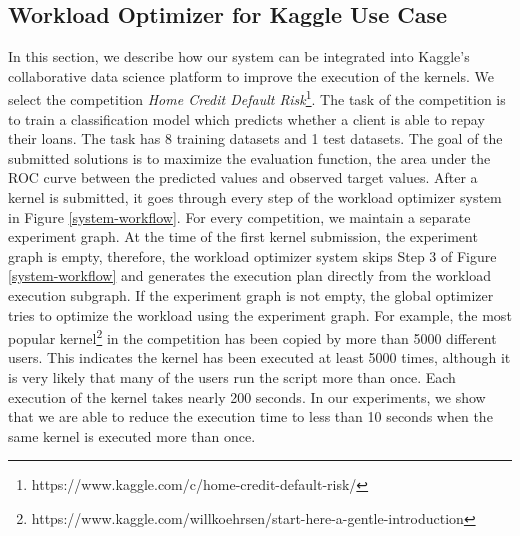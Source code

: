 \subsection{Workload Optimizer for Kaggle Use Case}
In this section, we describe how our system can be integrated into Kaggle's collaborative data science platform to improve the execution of the kernels.
We select the competition \textit{Home Credit Default Risk}\footnote{https://www.kaggle.com/c/home-credit-default-risk/}.
The task of the competition is to train a classification model which predicts whether a client is able to repay their loans.
The task has 8 training datasets and 1 test datasets.
The goal of the submitted solutions is to maximize the evaluation function, the area under the ROC curve between the predicted values and observed target values.
After a kernel is submitted, it goes through every step of the workload optimizer system in Figure \ref{system-workflow}.
For every competition, we maintain a separate experiment graph.
At the time of the first kernel submission, the experiment graph is empty, therefore, the workload optimizer system skips Step 3 of Figure \ref{system-workflow} and generates the execution plan directly from the workload execution subgraph.
If the experiment graph is not empty, the global optimizer tries to optimize the workload using the experiment graph.
For example, the most popular kernel\footnote{https://www.kaggle.com/willkoehrsen/start-here-a-gentle-introduction} in the competition has been copied by more than 5000 different users.
This indicates the kernel has been executed at least 5000 times, although it is very likely that many of the users run the script more than once.
Each execution of the kernel takes nearly 200 seconds.
In our experiments, we show that we are able to reduce the execution time to less than 10 seconds when the same kernel is executed more than once.
%

